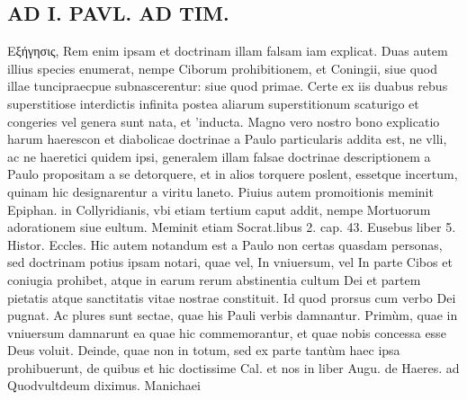 \documentclass{article}
\begin{document}
\begin{pages}
\section*{AD I. PAVL. AD TIM. }
\marginpar{[ p.188 ]}\pstart Εξήγησις, Rem enim ipsam et doctrinam illam falsam iam explicat. Duas autem illius species enumerat, nempe Ciborum prohibitionem, et Coningii, siue quod illae tuncipraecpue subnascerentur: siue quod primae. Certe ex iis duabus rebus superstitiose interdictis infinita postea aliarum superstitionum scaturigo et congeries vel genera sunt nata, et ’inducta. Magno vero nostro bono explicatio harum haerescon et diabolicae doctrinae a Paulo particularis addita est, ne vlli, ac ne haeretici quidem ipsi, generalem illam falsae doctrinae descriptionem a Paulo propositam a se detorquere, et in alios torquere poslent, essetque  incertum, quinam hic designarentur a viritu laneto. Piuius autem promoitionis meminit Epiphan. in Collyridianis, vbi etiam tertium caput addit, nempe Mortuorum adorationem siue eultum. Meminit etiam Socrat.libus 2. cap. 43. Eusebus liber 5. Histor. Eccles.  \pend\pstart Hic autem notandum est a Paulo non certas quasdam personas, sed doctrinam potius ipsam notari, quae vel, In vniuersum, vel In parte Cibos et coniugia prohibet, atque in earum rerum abstinentia cultum Dei et partem pietatis atque sanctitatis vitae nostrae constituit. Id quod prorsus cum verbo Dei pugnat.  \pend\pstart Ac plures sunt sectae, quae his Pauli verbis damnantur. Primùm, quae in vniuersum damnarunt ea quae hic commemorantur, et quae nobis concessa esse Deus voluit. Deinde, quae non in totum, sed ex parte tantùm haec ipsa prohibuerunt, de quibus et hic doctissime Cal. et nos in liber  Augu. de Haeres. ad Quodvultdeum diximus. Manichaei  \pend

\end{pages}
\end{document}
